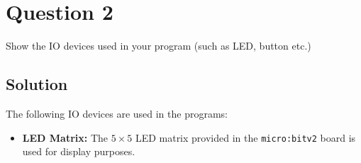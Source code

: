 \section*{Question 2}

Show the IO devices used in your program (such as LED, button etc.)

\subsection*{Solution}

The following IO devices are used in the programs:
\begin{itemize}
    \item \textbf{LED Matrix:} The \( 5 \times 5 \) LED matrix provided in the \texttt{micro:bit\;v2} board is used for display purposes.
\end{itemize}
